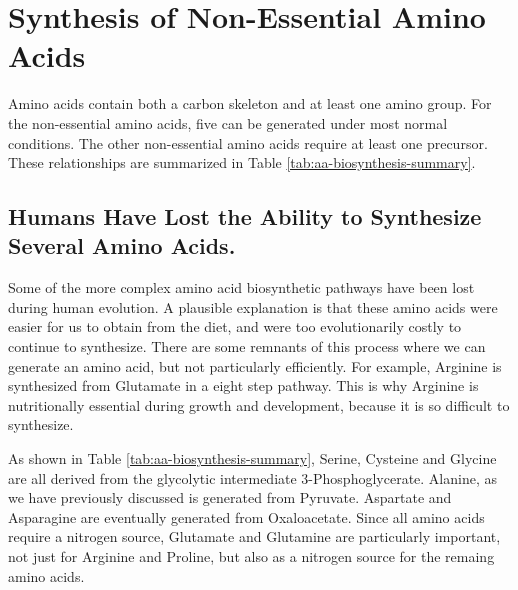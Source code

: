 \documentclass{tufte-handout}
\begin{document}
\section{Synthesis of Non-Essential Amino Acids}

Amino acids contain both a carbon skeleton and at least one amino group.  For the non-essential amino acids, five can be generated under most normal conditions.  The other non-essential amino acids require at least one precursor.  These relationships are summarized in Table \ref{tab:aa-biosynthesis-summary}.

\subsection{Humans Have Lost the Ability to Synthesize Several Amino Acids.}  Some of the more complex amino acid biosynthetic pathways have been lost during human evolution.  A plausible explanation is that these amino acids were easier for us to obtain from the diet, and were too evolutionarily costly to continue to synthesize.  There are some remnants of this process where we can generate an amino acid, but not particularly efficiently.   For example, Arginine is synthesized from Glutamate in a eight step pathway.  This is why Arginine is nutritionally essential during growth and development, because it is so difficult to synthesize.

  As shown in Table \ref{tab:aa-biosynthesis-summary}, Serine, Cysteine and Glycine are all derived from the glycolytic intermediate 3-Phosphoglycerate.  Alanine, as we have previously discussed is generated from Pyruvate.  Aspartate and Asparagine are eventually generated from Oxaloacetate.  Since all amino acids require a nitrogen source, Glutamate and Glutamine are particularly important, not just for Arginine and Proline, but also as a nitrogen source for the remaing amino acids. 
\end{document}

